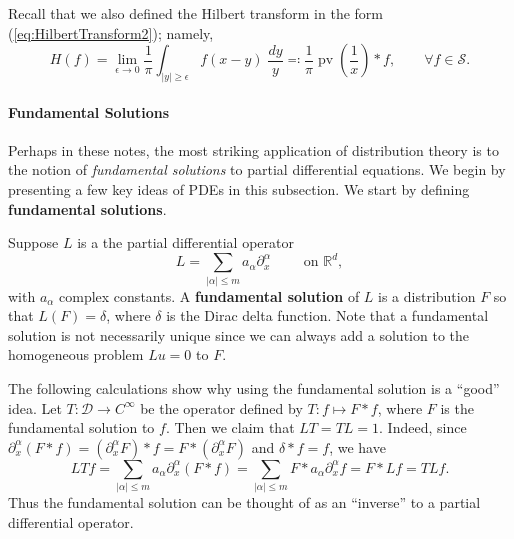 \documentclass{article}
\begin{document}
\begin{example}
	Recall that we also defined the Hilbert transform in the form (\ref{eq:HilbertTransform2}); namely, 
	\begin{equation*}
		H(f) = \lim_{\epsilon \to 0}\frac{1}{\pi}\int_{|y| \geq \epsilon}f(x  - y)\;\frac{dy}{y}  \eqqcolon \frac{1}{\pi}\operatorname{pv}\left(\frac{1}{x}\right) \ast f, \qquad \forall f \in\mathcal{S}. 
	\end{equation*} 
\end{example} 

\paragraph{Fundamental Solutions} 
Perhaps in these notes, the most striking application of distribution theory is to the notion of \textit{fundamental solutions} to partial differential equations. We begin by presenting a few key ideas of PDEs in this subsection. We start by defining \textbf{fundamental solutions}. 

\begin{definition}
	Suppose $L$ is a the partial differential operator 
	\begin{equation*}
		L = \sum_{|\alpha| \leq m}a_{\alpha}\partial_{x}^{\alpha} \qquad \text{ on $\mathbb{R}^{d}$}, 
	\end{equation*}
	with $a_{\alpha}$ complex constants. A \textbf{fundamental solution} of $L$ is a distribution $F$ so that $L(F) = \delta$, where $\delta$ is the Dirac delta function. Note that a fundamental solution is not necessarily unique since we can always add a solution to the homogeneous problem $Lu = 0$ to $F$. 
\end{definition} 
The following calculations show why using the fundamental solution is a ``good'' idea. Let $T: \mathcal{D} \to C^{\infty}$ be the operator defined by $T: f \mapsto F \ast f$, where $F$ is the fundamental solution to $f$. Then we claim that $LT = TL = 1$. Indeed, since $\partial_{x}^{\alpha}(F \ast f) = (\partial_{x}^{\alpha}F) \ast f= F \ast (\partial_{x}^{\alpha}F)$ and $\delta \ast f = f$, we have 
\begin{equation*}
	LTf = \sum_{|\alpha| \leq m}a_{\alpha}\partial_{x}^{\alpha}(F \ast f) = \sum_{|\alpha| \leq m}F \ast a_{\alpha}\partial_{x}^{\alpha}f = F \ast Lf = TLf. 
\end{equation*}
Thus the fundamental solution can be thought of as an ``inverse'' to a partial differential operator. 
\end{document}
